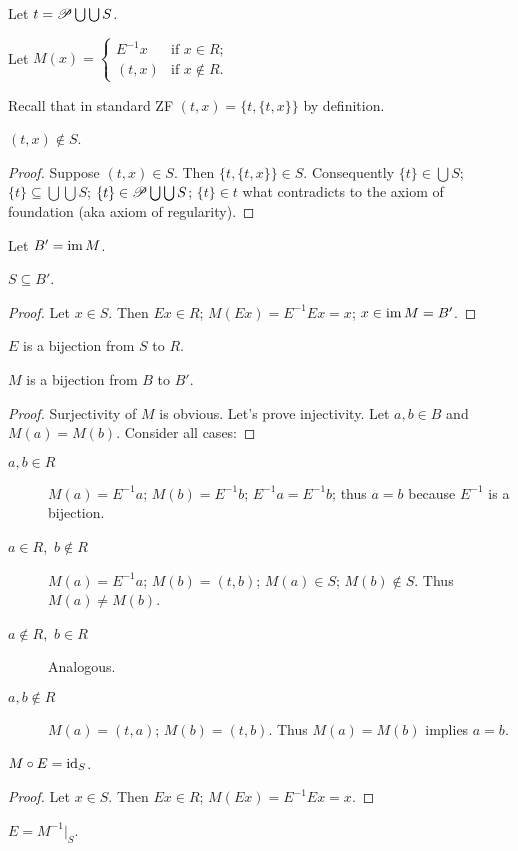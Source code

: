 Let $t=\mathscr{P}\bigcup\bigcup S$.

Let $M(x)=\left\{ \begin{array}{ll}
E^{-1}x & \text{if }x\in R;\\
(t,x) & \text{if }x\notin R.
\end{array}\right.$

Recall that in standard ZF $(t,x)=\{t,\{t,x\}\}$ by definition.
\begin{thm}
$(t,x)\notin S$.\end{thm}
\begin{proof}
Suppose $(t,x)\in S$. Then $\{t,\{t,x\}\}\in S$. Consequently $\{t\}\in\bigcup S$;
$\{t\}\subseteq\bigcup\bigcup S$; $\{t\}\in\mathscr{P}\bigcup\bigcup S$;
$\{t\}\in t$ what contradicts to the axiom of foundation (aka axiom
of regularity).\end{proof}
\begin{defn}
Let $B'=\operatorname{im} M$.\end{defn}
\begin{thm}
$S\subseteq B'$.\end{thm}
\begin{proof}
Let $x\in S$. Then $Ex\in R$; $M(Ex)=E^{-1}Ex=x$; $x\in\operatorname{im} M=B'$.\end{proof}
\begin{obvious}
$E$ is a bijection from $S$ to $R$.\end{obvious}
\begin{thm}
$M$ is a bijection from $B$ to $B'$.\end{thm}
\begin{proof}
Surjectivity of $M$ is obvious. Let's prove injectivity. Let $a,b\in B$
and $M(a)=M(b)$. Consider all cases: \end{proof}
\begin{description}
\item [{$a,b\in R$}] $M(a)=E^{-1}a$; $M(b)=E^{-1}b$; $E^{-1}a=E^{-1}b$;
thus $a=b$ because $E^{-1}$ is a bijection.
\item [{$a\in R$,~$b\notin R$}] $M(a)=E^{-1}a$; $M(b)=(t,b)$; $M(a)\in S$;
$M(b)\notin S$. Thus $M(a)\neq M(b)$.
\item [{$a\notin R$,~$b\in R$}] Analogous.
\item [{$a,b\notin R$}] $M(a)=(t,a)$; $M(b)=(t,b)$. Thus $M(a)=M(b)$
implies $a=b$. \end{description}
\begin{thm}
$M\circ E=\operatorname{id}_{S}$.\end{thm}
\begin{proof}
Let $x\in S$. Then $Ex\in R$; $M(Ex)=E^{-1}Ex=x$.\end{proof}
\begin{obvious}
$E=M^{-1}|_{S}$.
\end{obvious}

